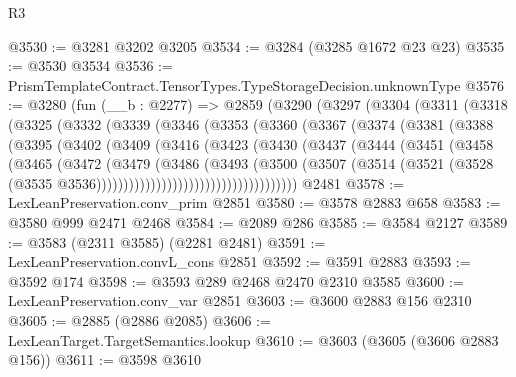 \begin{lexlean}{R3}
\begin{coremodule}
@3530 := @3281 @3202 @3205
@3534 := @3284 (@3285 @1672 @23 @23)
@3535 := @3530 @3534
@3536 := PrismTemplateContract.TensorTypes.TypeStorageDecision.unknownType
@3576 := @3280
    (fun (__b : @2277) =>
    @2859
      (@3290
        (@3297
          (@3304
            (@3311
              (@3318
                (@3325
                  (@3332
                    (@3339
                      (@3346
                        (@3353
                          (@3360
                            (@3367
                              (@3374
                                (@3381
                                  (@3388
                                    (@3395
                                      (@3402
                                        (@3409
                                          (@3416
                                            (@3423
                                              (@3430
                                                (@3437
                                                  (@3444
                                                    (@3451
                                                      (@3458
                                                        (@3465
                                                          (@3472
                                                            (@3479
                                                              (@3486
                                                                (@3493
                                                                  (@3500
                                                                    (@3507
                                                                      (@3514
                                                                        (@3521
                                                                          (@3528
                                                                            (@3535
                                                                              @3536)))))))))))))))))))))))))))))))))))))
    @2481
@3578 := LexLeanPreservation.conv_prim @2851
@3580 := @3578 @2883 @658
@3583 := @3580 @999 @2471 @2468
@3584 := @2089 @286
@3585 := @3584 @2127
@3589 := @3583 (@2311 @3585) (@2281 @2481)
@3591 := LexLeanPreservation.convL_cons @2851
@3592 := @3591 @2883
@3593 := @3592 @174
@3598 := @3593 @289 @2468 @2470 @2310 @3585
@3600 := LexLeanPreservation.conv_var @2851
@3603 := @3600 @2883 @156 @2310
@3605 := @2885 (@2886 @2085)
@3606 := LexLeanTarget.TargetSemantics.lookup
@3610 := @3603 (@3605 (@3606 @2883 @156))
@3611 := @3598 @3610

\end{coremodule}
\end{lexlean}
